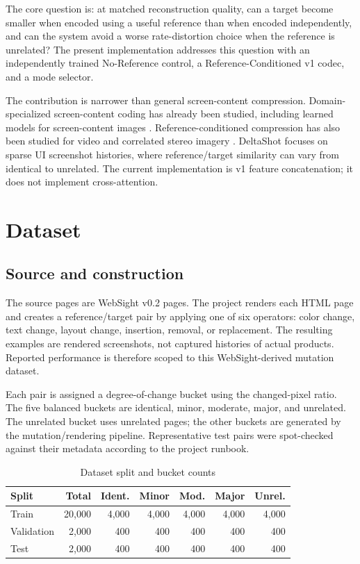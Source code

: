 \documentclass[conference]{IEEEtran}
\begin{document}
The core question is: at matched reconstruction quality, can a target become smaller when encoded using a useful reference than when encoded independently, and can the system avoid a worse rate-distortion choice when the reference is unrelated? The present implementation addresses this question with an independently trained No-Reference control, a Reference-Conditioned v1 codec, and a mode selector.

The contribution is narrower than general screen-content compression. Domain-specialized screen-content coding has already been studied, including learned models for screen-content images \cite{heris2023}. Reference-conditioned compression has also been studied for video and correlated stereo imagery \cite{li2021,mital2023}. DeltaShot focuses on sparse UI screenshot histories, where reference/target similarity can vary from identical to unrelated. The current implementation is v1 feature concatenation; it does not implement cross-attention.

\section{Dataset}
\subsection{Source and construction}
The source pages are WebSight v0.2 pages. The project renders each HTML page and creates a reference/target pair by applying one of six operators: color change, text change, layout change, insertion, removal, or replacement. The resulting examples are rendered screenshots, not captured histories of actual products. Reported performance is therefore scoped to this WebSight-derived mutation dataset.

Each pair is assigned a degree-of-change bucket using the changed-pixel ratio. The five balanced buckets are identical, minor, moderate, major, and unrelated. The unrelated bucket uses unrelated pages; the other buckets are generated by the mutation/rendering pipeline. Representative test pairs were spot-checked against their metadata according to the project runbook.

\begin{table}[t]
\caption{Dataset split and bucket counts}
\label{tab:dataset}
\centering
\footnotesize
\begin{tabular}{lrrrrrr}
\toprule
Split & Total & Ident. & Minor & Mod. & Major & Unrel.\\
\midrule
Train & 20,000 & 4,000 & 4,000 & 4,000 & 4,000 & 4,000\\
Validation & 2,000 & 400 & 400 & 400 & 400 & 400\\
Test & 2,000 & 400 & 400 & 400 & 400 & 400\\
\bottomrule
\end{tabular}
\end{table}
\end{document}
